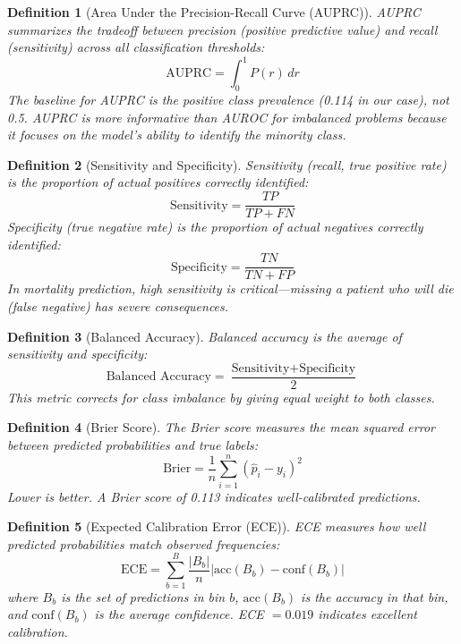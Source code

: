 \documentclass[11pt,a4paper]{report}
\newtheorem{definition}{Definition}[chapter]
\begin{document}
\begin{definition}[Area Under the Precision-Recall Curve (AUPRC)]
AUPRC summarizes the tradeoff between precision (positive predictive value) and recall (sensitivity) across all classification thresholds:
\begin{equation}
\text{AUPRC} = \int_0^1 P(r) \, dr
\end{equation}
The baseline for AUPRC is the positive class prevalence (0.114 in our case), not 0.5. AUPRC is more informative than AUROC for imbalanced problems because it focuses on the model's ability to identify the minority class.
\end{definition}

\begin{definition}[Sensitivity and Specificity]
Sensitivity (recall, true positive rate) is the proportion of actual positives correctly identified:
\begin{equation}
\text{Sensitivity} = \frac{TP}{TP + FN}
\end{equation}
Specificity (true negative rate) is the proportion of actual negatives correctly identified:
\begin{equation}
\text{Specificity} = \frac{TN}{TN + FP}
\end{equation}
In mortality prediction, high sensitivity is critical---missing a patient who will die (false negative) has severe consequences.
\end{definition}

\begin{definition}[Balanced Accuracy]
Balanced accuracy is the average of sensitivity and specificity:
\begin{equation}
\text{Balanced Accuracy} = \frac{\text{Sensitivity} + \text{Specificity}}{2}
\end{equation}
This metric corrects for class imbalance by giving equal weight to both classes.
\end{definition}

\begin{definition}[Brier Score]
The Brier score measures the mean squared error between predicted probabilities and true labels:
\begin{equation}
\text{Brier} = \frac{1}{n} \sum_{i=1}^n (\hat{p}_i - y_i)^2
\end{equation}
Lower is better. A Brier score of 0.113 indicates well-calibrated predictions.
\end{definition}

\begin{definition}[Expected Calibration Error (ECE)]
ECE measures how well predicted probabilities match observed frequencies:
\begin{equation}
\text{ECE} = \sum_{b=1}^B \frac{|B_b|}{n} |\text{acc}(B_b) - \text{conf}(B_b)|
\end{equation}
where $B_b$ is the set of predictions in bin $b$, $\text{acc}(B_b)$ is the accuracy in that bin, and $\text{conf}(B_b)$ is the average confidence. ECE $= 0.019$ indicates excellent calibration.
\end{definition}
\end{document}
